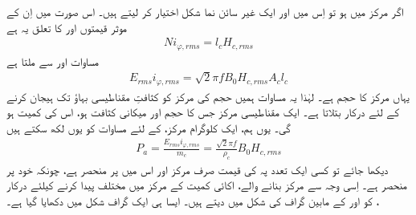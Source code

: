  اگر مرکز میں   ہو  تو اِس میں  اور  ایک غیر سائن نما شکل اختیار کر لیتے ہیں۔ اس صورت میں  اِن کے موثر قیمتوں  اور   کا تعلق یہ ہے
\begin{align}
N i_{\varphi,rms}=l_c H_{c,rms}
\end{align}
مساوات   اور  سے ملتا ہے
\begin{align}
E_{rms} i_{\varphi,rms}=\sqrt{2} \pi f B_0 H_{c,rms} A_c l_c
\end{align}
یہاں  مرکز کا حجم ہے۔ لہٰذا یہ مساوات ہمیں  حجم کی مرکز  کو  کثافتِ مقناطیسی بہاؤ تک ہیجان کرنے کے لئے درکار  بتلاتا ہے۔ ایک مقناطیسی مرکز جس کا حجم   اور  میکانی کثافت   ہو، اس کی کمیت  ہو گی۔ یوں ہم، ایک کلوگرام  مرکز، کے لئے مساوات   کو یوں لکھ سکتے ہیں
\begin{align}
P_a=\frac{E_{rms} i_{\varphi,rms}}{m_c}=\frac{\sqrt{2} \pi f}{\rho_c} B_0 H_{c,rms}
\end{align}
دیکھا جائے تو کسی ایک تعدد   پہ  کی قیمت صرف مرکز اور اس میں  پر منحصر ہے، چونکہ  خود  پر منحصر ہے۔ اِسی وجہ سے مرکز بنانے والے، اکائی کمیت کے مرکز میں مختلف  پیدا کرنے کیلئے درکار ، کو  اور  کے مابین گراف کی شکل میں دیتے ہیں۔ ایسا ہی ایک گراف شکل میں دکھایا گیا ہے۔

